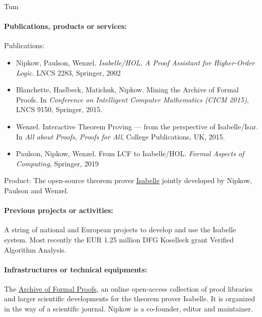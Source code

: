 \begin{sitedescription}{Tum}
\begin{compactitem}
\item{} 
\end{compactitem}

\paragraph{Publications, products or services:}

Publications:
\begin{itemize}
\item Nipkow, Paulson, Wenzel. \emph{Isabelle/HOL. A Proof
    Assistant for Higher-Order Logic}. LNCS 2283, Springer, 2002
\item Blanchette, Haslbeck, Matichuk, Nipkow. Mining the Archive of
  Formal Proofs. In \emph{Conference on Intelligent Computer
    Mathematics (CICM 2015)}, LNCS 9150, Springer, 2015.
\item Wenzel. Interactive Theorem Proving --- from the perspective of Isabelle/Isar.
  In \emph{All about Proofs, Proofs for All}, College Publications, UK, 2015.
\item Paulson, Nipkow, Wenzel. From LCF to
  Isabelle/HOL. \emph{Formal Aspects of Computing}, Springer, 2019
\end{itemize}

Product: The open-source theorem prover  \href{https://isabelle.in.tum.de}{Isabelle}
jointly developed by Nipkow, Paulson and Wenzel.

\paragraph{Previous projects or activities:}

A string of national and European projects to develop and use the Isabelle
system. Most recently the EUR 1.25 million DFG Koselleck grant Verified Algorithm Analysis.

\paragraph{Infrastructures or technical equipments:}

The \href{http://www.isa-afp.org}{Archive of Formal Proofs}, an online
open-access collection of proof libraries and larger scientific
developments for the theorem prover Isabelle. It is organized in the
way of a scientific journal.  Nipkow is a co-founder, editor and maintainer.


\end{sitedescription}
